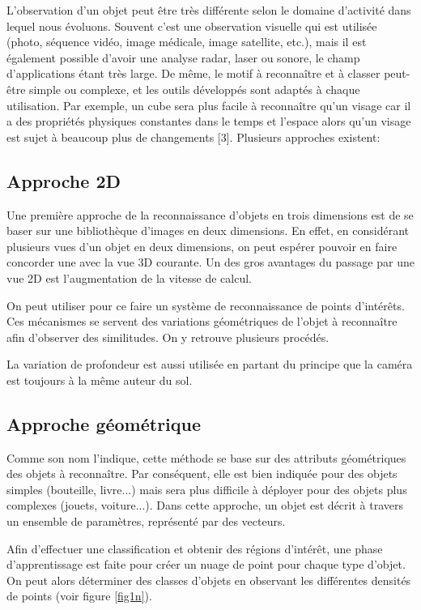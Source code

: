 \documentclass[12pt,a4paper,oneside]{book}
\begin{document}
	L’observation d’un objet peut être très différente selon le domaine d’activité dans lequel nous évoluons. Souvent c’est une observation visuelle qui est utilisée (photo, séquence vidéo, image médicale, image satellite, etc.), mais il est également possible d’avoir une analyse radar, laser ou sonore, le champ d’applications étant très large.
	 De même, le motif à reconnaître et à classer peut-être simple ou complexe, et les outils développés sont adaptés à chaque utilisation. Par exemple, un cube sera plus facile à reconnaître qu’un visage car il a des propriétés physiques constantes dans le temps et l’espace  alors qu’un visage est sujet à beaucoup plus de changements [3]. Plusieurs approches existent:
	
	\subsection{Approche 2D}
	Une première approche de la reconnaissance d’objets en trois dimensions est de se baser sur une bibliothèque d’images en deux dimensions. En effet, en considérant plusieurs vues d’un objet en deux dimensions, on peut espérer pouvoir en faire concorder une avec la vue 3D courante. Un des gros avantages du passage par une vue 2D est l’augmentation de la vitesse de calcul.
	
	On peut utiliser pour ce faire un système de reconnaissance de points d’intérêts. Ces mécanismes se servent des variations géométriques de l’objet à reconnaître afin d’observer des similitudes. On y retrouve plusieurs procédés.
	
	La variation de profondeur est aussi utilisée en partant du principe que la caméra est toujours à la même auteur du sol.
	
	\subsection{Approche géométrique}
	
	Comme son nom l’indique, cette méthode se base sur des attributs géométriques des objets à reconnaître. Par conséquent, elle est bien indiquée pour des objets simples (bouteille, livre...) mais sera plus difficile à déployer pour des objets plus complexes (jouets, voiture...).
	Dans cette approche, un objet est décrit à travers un ensemble de paramètres, représenté par des vecteurs.
	
	Afin d’effectuer une classification et obtenir des régions d’intérêt, une phase d’apprentissage est faite pour créer un nuage de point pour chaque type d’objet. On peut alors déterminer des classes d’objets en observant les différentes densités de points (voir figure \ref{fig1n}).
	
\end{document}
